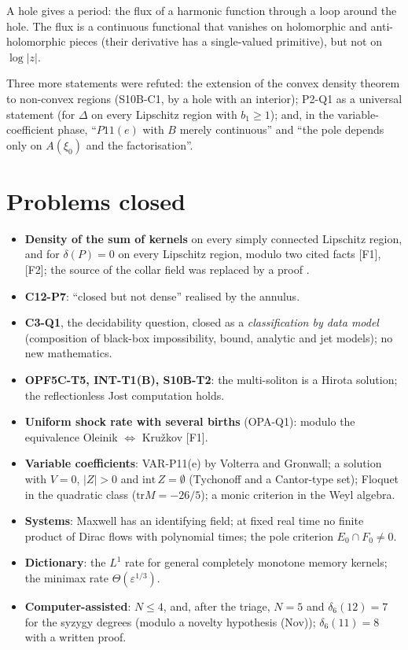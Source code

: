 \begin{intuition}
A hole gives a period: the flux of a harmonic function through a loop around the hole. The flux is a continuous functional that vanishes on holomorphic and anti-holomorphic pieces (their derivative has a single-valued primitive), but not on $\log|z|$.
\end{intuition}

Three more statements were refuted: the extension of the convex density theorem to non-convex regions (S10B-C1, by a hole with an interior); P2-Q1 as a universal statement (for $\Delta$ on every Lipschitz region with $b_1\ge1$); and, in the variable-coefficient phase, ``$P11(e)$ with $B$ merely continuous'' and ``the pole depends only on $A(\xi_0)$ and the factorisation''.

\section{Problems closed}

\begin{itemize}
\item \textbf{Density of the sum of kernels} on every simply connected Lipschitz region, and for $\delta(P)=0$ on every Lipschitz region, modulo two cited facts [F1], [F2]; the source of the collar field was replaced by a proof .
\item \textbf{C12-P7}: ``closed but not dense'' realised by the annulus.
\item \textbf{C3-Q1}, the decidability question, closed as a \emph{classification by data model} (composition of black-box impossibility, bound, analytic and jet models); no new mathematics.
\item \textbf{OPF5C-T5, INT-T1(B), S10B-T2}: the multi-soliton is a Hirota solution; the reflectionless Jost computation holds.
\item \textbf{Uniform shock rate with several births} (OPA-Q1): modulo the equivalence Oleinik $\Leftrightarrow$ Kru\v zkov [F1].
\item \textbf{Variable coefficients}: VAR-P11(e) by Volterra and Gronwall; a solution with $V=0$, $|Z|>0$ and $\mathrm{int}\,Z=\emptyset$ (Tychonoff and a Cantor-type set); Floquet in the quadratic class ($\mathrm{tr}M=-26/5$); a monic criterion in the Weyl algebra.
\item \textbf{Systems}: Maxwell has an identifying field; at fixed real time no finite product of Dirac flows with polynomial times; the pole criterion $E_0\cap F_0\ne0$.
\item \textbf{Dictionary}: the $L^1$ rate for general completely monotone memory kernels; the minimax rate $\Theta(\varepsilon^{1/3})$.
\item \textbf{Computer-assisted}: $N\le4$, and, after the triage, $N=5$ and $\delta_6(12)=7$ for the syzygy degrees (modulo a novelty hypothesis (Nov)); $\delta_6(11)=8$ with a written proof.
\end{itemize}

